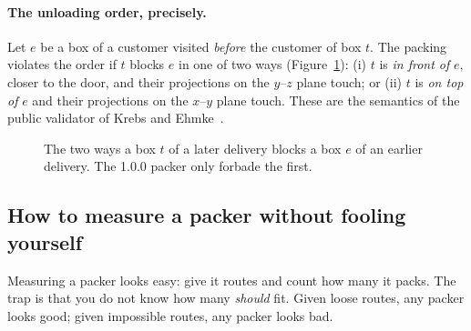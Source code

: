 \documentclass[11pt,a4paper]{article}
\begin{document}
\paragraph{The unloading order, precisely.} Let $e$ be a box of a customer visited \emph{before} the
customer of box $t$. The packing violates the order if $t$ blocks $e$ in one of two ways
(Figure~\ref{fig:lifo}): (i) $t$ is \emph{in front of} $e$, closer to the door, and their projections on
the $y$--$z$ plane touch; or (ii) $t$ is \emph{on top of} $e$ and their projections on the $x$--$y$
plane touch. These are the semantics of the public validator of Krebs and
Ehmke~\cite{krebs2023,krebsvalidator}.

\begin{figure}[H]
\centering
{}
\caption{The two ways a box $t$ of a later delivery blocks a box $e$ of an earlier delivery. The 1.0.0
packer only forbade the first.}
\label{fig:lifo}
\end{figure}

\subsection{How to measure a packer without fooling yourself}

Measuring a packer looks easy: give it routes and count how many it packs. The trap is that you do not
know how many \emph{should} fit. Given loose routes, any packer looks good; given impossible routes, any
packer looks bad.
\end{document}
